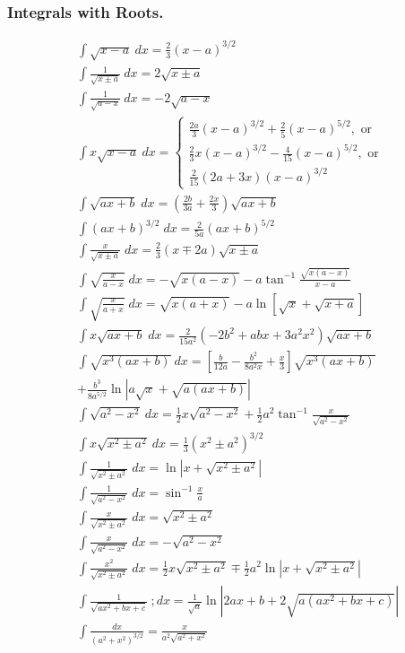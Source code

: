 \documentclass[../main.tex]{subfiles}
\begin{document}
\subsubsection*{Integrals with Roots.}
\begin{align*}
    &\int \sqrt{x-a}\ dx = \frac{2}{3}(x-a)^{3/2}\\
    &\int \frac{1}{\sqrt{x\pm a}}\ dx = 2\sqrt{x\pm a} \\
    &\int \frac{1}{\sqrt{a-x}}\ dx = -2\sqrt{a-x} \\
    &\int x\sqrt{x-a}\ dx =  \begin{cases}\frac{2 a}{3} \left({x-a}\right)^{3/2} +\frac{2 }{5}\left( {x-a}\right)^{5/2},\text{ or} \\ \frac{2}{3} x(x-a)^{3/2} - \frac{4}{15} (x-a)^{5/2}, \text{ or}\\ \frac{2}{15}(2a+3x)(x-a)^{3/2}
    \end{cases}\\
    &\int \sqrt{ax+b}\; dx = \left(\frac{2b}{3a}+\frac{2x}{3}\right)\sqrt{ax+b} \\
    &\int (ax+b)^{3/2}\; dx =\frac{2}{5a}(ax+b)^{5/2}\\
    &\int \frac{x}{\sqrt{x\pm a} } \; dx = \frac{2}{3}(x\mp 2a)\sqrt{x\pm a}\\
    &\int \sqrt{\frac{x}{a-x}}\; dx =  -\sqrt{x(a-x)}-a\tan^{-1}\frac{\sqrt{x(a-x)}}{x-a}\\
    &\int \sqrt{\frac{x}{a+x}}\; dx =  \sqrt{x(a+x)} -a\ln  [ \sqrt{x} + \sqrt{x+a}] \\
    &\int x \sqrt{ax + b}\; dx =\frac{2}{15 a^2}(-2b^2+abx + 3 a^2 x^2)\sqrt{ax+b}\\
    &\int \sqrt{x^3(ax+b)} \ dx =\left[ \frac{b}{12a}-\frac{b^2}{8a^2x}+\frac{x}{3}\right] \sqrt{x^3(ax+b)} \\
    & + \frac{b^3}{8a^{5/2}}\ln \left| a\sqrt{x} + \sqrt{a(ax+b)} \right|\\
    &\int  \sqrt{a^2 - x^2}\ dx = \frac{1}{2} x \sqrt{a^2-x^2} +\frac{1}{2}a^2\tan^{-1}\frac{x}{\sqrt{a^2-x^2}}\\
    &\int  x \sqrt{x^2 \pm a^2}\ dx= \frac{1}{3}\left( x^2 \pm a^2 \right)^{3/2} \\
    &\int \frac{1}{\sqrt{x^2 \pm a^2}}\; dx = \ln \left| x + \sqrt{x^2 \pm a^2} \right| \\
    &\int \frac{1}{\sqrt{a^2 - x^2}}\; dx = \sin^{-1}\frac{x}{a} \\
    &\int \frac{x}{\sqrt{x^2\pm a^2}}\; dx = \sqrt{x^2 \pm a^2} \\
    &\int \frac{x}{\sqrt{a^2-x^2}}\; dx = -\sqrt{a^2-x^2} \\
    &\int \frac{x^2}{\sqrt{x^2 \pm a^2}}\; dx = \frac{1}{2}x\sqrt{x^2 \pm a^2}\mp \frac{1}{2}a^2 \ln \left| x + \sqrt{x^2\pm a^2} \right| \\
    &\int\frac{1}{\sqrt{ax^2+bx+c}}\ ;dx=\frac{1}{\sqrt{a}}\ln \left| 2ax+b + 2 \sqrt{a(ax^2+bx+c)} \right| \\
    &\int\frac{dx}{(a^2+x^2)^{3/2}}=\frac{x}{a^2\sqrt{a^2+x^2}}\\
\end{align*}
\end{document}
